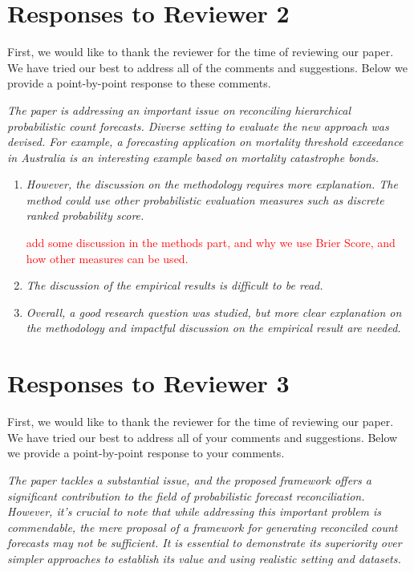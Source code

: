 \documentclass[11pt,a4paper]{article}
\newcommand{\RE}[2][Re:~]{{\color{blue}\textbf{#1}#2}}
\begin{document}
\section*{Responses to Reviewer 2}\label{reviewer-2-comments}

\RE[]{First, we would like to thank the reviewer for the time of reviewing our paper. We have tried our best to address all of the comments and suggestions. Below we provide a point-by-point response to these comments.}

\textit{The paper is addressing an important issue on reconciling hierarchical probabilistic count forecasts. Diverse setting to evaluate the new approach was devised. For example, a forecasting application on mortality threshold exceedance in Australia is an interesting example based on mortality catastrophe bonds.}

\begin{enumerate}
    \item \textit{However, the discussion on the methodology requires more explanation. The method could use other probabilistic evaluation measures such as discrete ranked probability score.}
    
    \textcolor{red}{add some discussion in the methods part, and why we use Brier Score, and how other measures can be used.}

    \item \textit{The discussion of the empirical results is difficult to be read.}
    \item \textit{Overall, a good research question was studied, but more clear explanation on the methodology and impactful discussion on the empirical result are needed.}
\end{enumerate}




\newpage
\section*{Responses to Reviewer 3}\label{reviewer-3-comments}

\RE[]{First, we would like to thank the reviewer for the time of reviewing our paper. We have tried our best to address all of your comments and suggestions. Below we provide a point-by-point response to your comments.}


\textit{The paper tackles a substantial issue, and the proposed framework offers a significant contribution to the field of probabilistic forecast reconciliation. However, it's crucial to note that while addressing this important problem is commendable, the mere proposal of a framework for generating reconciled count forecasts may not be sufficient. It is essential to demonstrate its superiority over simpler approaches to establish its value and using realistic setting and datasets.}
\end{document}

